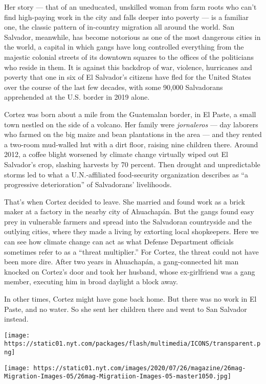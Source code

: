 Her story --- that of an uneducated, unskilled woman from farm roots who
can't find high-paying work in the city and falls deeper into poverty
--- is a familiar one, the classic pattern of in-country migration all
around the world. San Salvador, meanwhile, has become notorious as one
of the most dangerous cities in the world, a capital in which gangs have
long controlled everything from the majestic colonial streets of its
downtown squares to the offices of the politicians who reside in them.
It is against this backdrop of war, violence, hurricanes and poverty
that one in six of El Salvador's citizens have fled for the United
States over the course of the last few decades, with some 90,000
Salvadorans apprehended at the U.S. border in 2019 alone.

Cortez was born about a mile from the Guatemalan border, in El Paste, a
small town nestled on the side of a volcano. Her family were
\emph{jornaleros} --- day laborers who farmed on the big maize and bean
plantations in the area --- and they rented a two-room mud-walled hut
with a dirt floor, raising nine children there. Around 2012, a coffee
blight worsened by climate change virtually wiped out El Salvador's
crop, slashing harvests by 70 percent. Then drought and unpredictable
storms led to what a U.N.-affiliated food-security organization
describes as ``a progressive deterioration'' of Salvadorans'
livelihoods.

That's when Cortez decided to leave. She married and found work as a
brick maker at a factory in the nearby city of Ahuachapán. But the gangs
found easy prey in vulnerable farmers and spread into the Salvadoran
countryside and the outlying cities, where they made a living by
extorting local shopkeepers. Here we can see how climate change can act
as what Defense Department officials sometimes refer to as a ``threat
multiplier.'' For Cortez, the threat could not have been more dire.
After two years in Ahuachapán, a gang-connected hit man knocked on
Cortez's door and took her husband, whose ex-girlfriend was a gang
member, executing him in broad daylight a block away.

In other times, Cortez might have gone back home. But there was no work
in El Paste, and no water. So she sent her children there and went to
San Salvador instead.

\texttt{[image: https://static01.nyt.com/packages/flash/multimedia/ICONS/transparent.png]}

\texttt{[image: https://static01.nyt.com/images/2020/07/26/magazine/26mag-Migration-Images-05/26mag-Migratiion-Images-05-master1050.jpg]}

